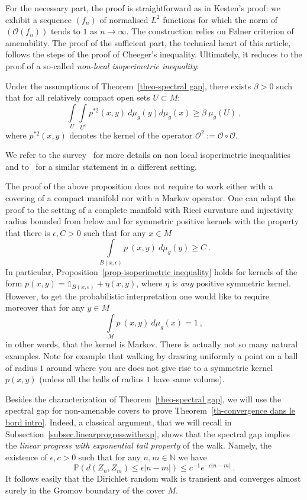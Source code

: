 \documentclass[AHL,Unicode,longabstracts,published]{cedram}
\newcommand{\dsun}{\mathds{1}}
\newcommand{\cO}{\mathcal{O}}
\newcommand{\PP}{\mathbb{P}}
\newcommand{\NN}{\mathbb{N}}
\newcommand{\inte}[1]{\underset{#1}{\int}}
\begin{document}
For the necessary part, the proof is straightforward as in Kesten's proof: we exhibit a sequence $(f_n)$ of normalised $L^2$ functions for which the norm of $(\cO(f_n))$ tends to $1$ as $n \to \infty$. The construction relies on F\o lner criterion of amenability. The proof of the sufficient part, the technical heart of this article, follows the steps of the proof of Cheeger's inequality. Ultimately, it reduces to the proof of a so-called \emph{non-local isoperimetric inequality}:

\begin{prop}\label{prop-isoperimetric inequality}
Under the assumptions of Theorem~\ref{theo-spectral gap}, there exists $\beta >0$ such that for all relatively compact open sets $U\subset M$:
\[
\inte{U} \inte{U^c} p^{*2}(x,y) \ d \mu_g(y) d \mu_g(x) \geq \beta \ \mu_g (U) \ ,
\]
where $p^{*2}(x,y)$ denotes the kernel of the operator $\cO^2 := \cO \circ \cO$.
\end{prop}

We refer to the survey~\cite{surveynonlocalperimeter} for more details on non local isoperimetric inequalities and to~\cite{artnonlocalperimeter} for a similar statement in a different setting.

\begin{rema}
The proof of the above proposition does not require to work either with a covering of a compact manifold nor with a Markov operator. One can adapt the proof to the setting of a complete manifold with Ricci curvature and injectivity radius bounded from below and for symmetric positive kernels with the property that there is $\epsilon, C > 0$ such that for any $x \in M$
\[
\inte{B(x, \epsilon)} p~(x,y) \ d \mu_g(y) \ge C \ .
\]
In particular, Proposition~\ref{prop-isoperimetric inequality} holds for kernels of the form $p(x,y)= \dsun_{B(x,\epsilon)} +\eta(x,y)$, where $\eta$ is \emph{any} positive symmetric kernel. However, to get the probabilistic interpretation one would like to require moreover that for any $y \in M$
\[
\inte{M} p~(x,y) \ d \mu_g(x) =1 \ ,
\]
in other words, that the kernel is Markov. There is actually not so many natural examples. Note for example that walking by drawing uniformly a point on a ball of radius $1$ around where you are does not give rise to a symmetric kernel $p(x,y)$ (unless all the balls of radius $1$ have same volume).
\end{rema}

Besides the characterization of Theorem~\ref{theo-spectral gap}, we will use the spectral gap for non-amenable covers to prove Theorem~\ref{th-convergence dans le bord intro}. Indeed, a classical argument, that we will recall in Subsection~\ref{subsec.linearprogresswithexp}, shows that the spectral gap implies the \emph{linear progress with exponential tail property} of the walk. Namely, the existence of $\epsilon, c > 0$ such that for any $ n,m \in \NN$ we have
\begin{equation}\label{eqdef-linearprogress}
\PP\left(d\left(Z_n,Z_m\right) \leq \epsilon \left|n-m\right|\right) \le c^{-1} e^{-c |n-m|} \ .
\end{equation}
It follows easily that the Dirichlet random walk is transient and converges almost surely in the Gromov boundary of the cover $M$. 
\end{document}
